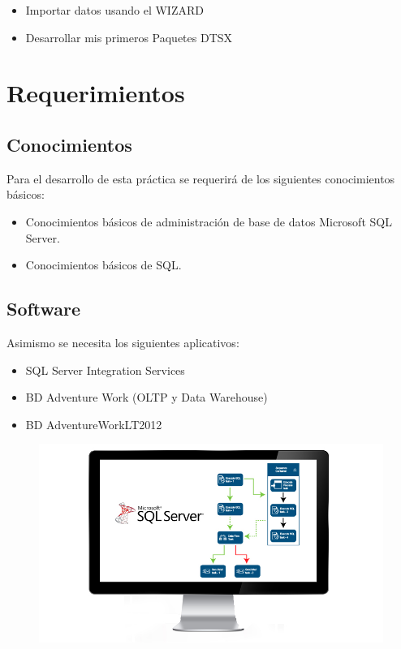 \documentclass[12pt,letterpaper]{article}
\begin{document}
\begin{itemize}
\item Importar datos usando el WIZARD 
\item Desarrollar mis primeros Paquetes DTSX

\end{itemize}

\section {\textbf{Requerimientos}}

\subsection{\textbf{Conocimientos}}
Para el desarrollo de esta práctica se requerirá de los siguientes conocimientos básicos:
\begin{itemize}
\item Conocimientos básicos de administración de base de datos Microsoft SQL Server.
\item Conocimientos básicos de SQL.
\end{itemize}



\subsection{\textbf{Software}}
Asimismo se necesita los siguientes aplicativos:
\begin{itemize}
\item SQL Server Integration Services
\item BD Adventure Work (OLTP y Data Warehouse)
\item BD AdventureWorkLT2012
\end{itemize}


	\begin{figure}[htb]
		\begin{center}
			\includegraphics[width=13cm]{./IMAGENES/MS-SQL-Server-Integration-Services}
			
		\end{center}
	\end{figure}
\end{document}

